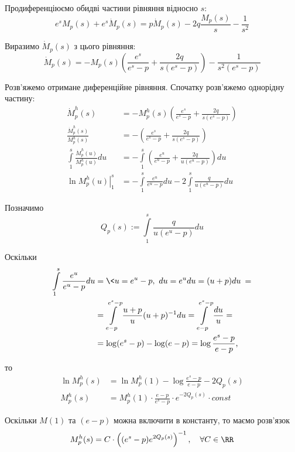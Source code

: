 Продиференціюємо обидві частини рівняння відносно $s$:
\begin{equation}
e^s M_{p}(s) + e^s \dot M_{p}(s) =p \dot M_{p}(s) - 2 q \frac{M_{p}(s)}{s}  - \frac1{s^2}
\end{equation}

Виразимо $\dot M_{p}(s)$ з цього рівняння:
\begin{equation}
\label{eq:model_laplace_diff}
\dot M_{p}(s) = - M_{p}(s)\left(\frac{e^s}{e^s - p} + \frac{2q}{s(e^s - p)}\right) - \frac{1}{s^2(e^s - p)}
\end{equation}

Розв'яжемо отримане диференційне рівняння. Спочатку розв'яжемо однорідну частину:
\begin{align*}
\dot M_{p}^{h} (s) &= - M_{p}^{h} (s)\left(\frac{e^s}{e^s - p} + \frac{2q}{s(e^s - p)}\right) \\
\frac{\dot M_{p}^{h} (s)}{M_{p}^{h} (s)} &= -\left(\frac{e^s}{e^s - p} + \frac{2q}{s(e^s - p)}\right) \\
\int\limits_1^s \frac{\dot M_{p}^{h} (u)}{M_{p}^{h} (u)} du &= -\int\limits_1^s \left(\frac{e^u}{e^u - p} + \frac{2q}{u(e^u - p)}\right) du \\
\left. \ln{M_{p}^{h} (u)}\right|_1^s &= - \int\limits_1^s \frac{e^u}{e^u - p} du  - 2 \int\limits_1^s \frac{q}{u(e^u - p)} du
\end{align*}

Позначимо
\begin{equation}
\label{eq:partial_li_p}
Q_p(s) := \int\limits_1^s \frac{q}{u(e^u - p)} du
\end{equation}

Оскільки
\begin{align*}
\int\limits_1^s \frac{e^u}{e^u - p} du &= \< u = e^u - p,~ du = e^u du = (u+p) du \> = \\
&= \int\limits_{e-p}^{e^s -p} \frac{u + p}{u} (u+p)^{-1} du = 
\int\limits_{e-p}^{e^s -p} \frac{du}{u} = \\
&= \log(e^s - p) - \log(e-p) = \log \frac{e^s - p}{e - p} \text{,}
\end{align*}

то
\begin{align*}
\ln{M_{p}^{h} (s)} &= \ln{M_{p}^{h} (1)} - \log \frac{e^s - p}{e - p} - 2Q_p(s) \\
M_{p}^{h} (s) &= M_{p}^{h} (1) \cdot \frac{e - p}{e^s - p} \cdot e^{- 2Q_p(s)} \cdot const
\end{align*}

Оскільки $M(1)$ та $(e-p)$ можна включити в константу, то маємо розв'язок
\begin{equation}
\label{eq:model_laplace_homogen_sol}
M_{p}^{h} (s) = C \cdot \left((e^s - p)  e^{2Q_p(s)}\right)^{-1}, \quad \forall C \in \RR
\end{equation}

